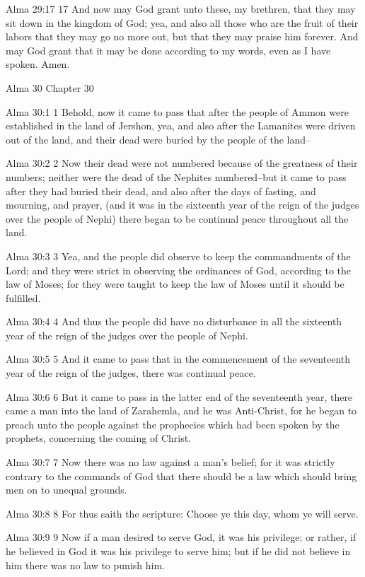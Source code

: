 Alma 29:17
 17 And now may God grant unto these, my brethren, that they may
sit down in the kingdom of God; yea, and also all those who are
the fruit of their labors that they may go no more out, but that
they may praise him forever. And may God grant that it may be
done according to my words, even as I have spoken. Amen.

Alma 30
Chapter 30

Alma 30:1
 1 Behold, now it came to pass that after the people of Ammon
were established in the land of Jershon, yea, and also after the
Lamanites were driven out of the land, and their dead were buried
by the people of the land--

Alma 30:2
 2 Now their dead were not numbered because of the greatness of
their numbers; neither were the dead of the Nephites
numbered--but it came to pass after they had buried their dead,
and also after the days of fasting, and mourning, and prayer,
(and it was in the sixteenth year of the reign of the judges over
the people of Nephi) there began to be continual peace throughout
all the land.

Alma 30:3
 3 Yea, and the people did observe to keep the commandments of
the Lord; and they were strict in observing the ordinances of
God, according to the law of Moses; for they were taught to keep
the law of Moses until it should be fulfilled.

Alma 30:4
 4 And thus the people did have no disturbance in all the
sixteenth year of the reign of the judges over the people of
Nephi.

Alma 30:5
 5 And it came to pass that in the commencement of the
seventeenth year of the reign of the judges, there was continual
peace.

Alma 30:6
 6 But it came to pass in the latter end of the seventeenth year,
there came a man into the land of Zarahemla, and he was
Anti-Christ, for he began to preach unto the people against the
prophecies which had been spoken by the prophets, concerning the
coming of Christ.

Alma 30:7
 7 Now there was no law against a man's belief; for it was
strictly contrary to the commands of God that there should be a
law which should bring men on to unequal grounds.

Alma 30:8
 8 For thus saith the scripture: Choose ye this day, whom ye will
serve.

Alma 30:9
 9 Now if a man desired to serve God, it was his privilege; or
rather, if he believed in God it was his privilege to serve him;
but if he did not believe in him there was no law to punish him.

